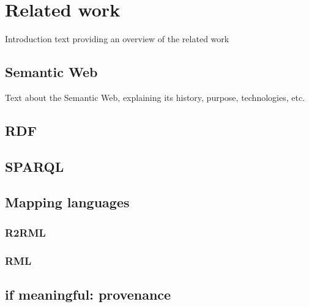 
\chapter{Related work}
\label{chapter:related_work}

Introduction text providing an overview of the related work

\section{Semantic Web}
Text about the Semantic Web, explaining its history, purpose, technologies, etc.

\section{RDF}

\section{SPARQL}

\section{Mapping languages}

\subsection{R2RML}
\subsection{RML}

\section{if meaningful: provenance}
